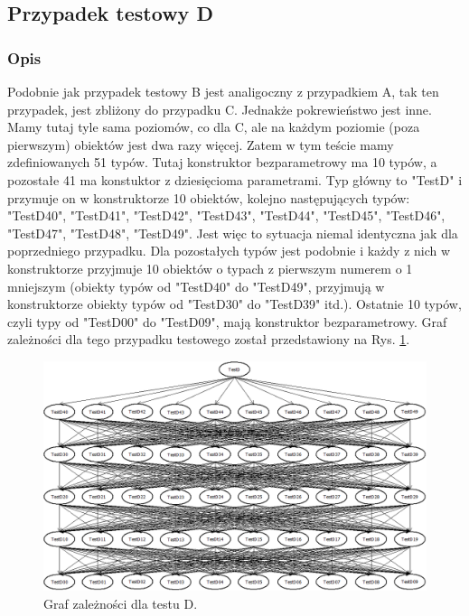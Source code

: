 \documentclass[12pt]{article}
\begin{document}
\subsection{Przypadek testowy D}
\subsubsection{Opis}
Podobnie jak przypadek testowy B jest analigoczny z przypadkiem A, tak ten przypadek, jest zbliżony do przypadku C. Jednakże pokrewieństwo jest inne. Mamy tutaj tyle sama poziomów, co dla C, ale na każdym poziomie (poza pierwszym) obiektów jest dwa razy więcej. Zatem w tym teście mamy zdefiniowanych 51 typów. Tutaj konstruktor bezparametrowy ma 10 typów, a pozostałe 41 ma konstuktor z dziesięcioma parametrami. Typ główny to "TestD" i przymuje on w konstruktorze 10 obiektów, kolejno następujących typów: "TestD40", "TestD41", "TestD42", "TestD43", "TestD44", "TestD45", "TestD46", "TestD47", "TestD48", "TestD49". Jest więc to sytuacja niemal identyczna jak dla poprzedniego przypadku. Dla pozostałych typów jest podobnie i każdy z nich w konstruktorze przyjmuje 10 obiektów o typach z pierwszym numerem o 1 mniejszym (obiekty typów od "TestD40" do "TestD49", przyjmują w konstruktorze obiekty typów od "TestD30" do "TestD39" itd.). Ostatnie 10 typów, czyli typy od "TestD00" do "TestD09", mają konstruktor bezparametrowy. Graf zależności dla tego przypadku testowego został przedstawiony na Rys. \ref{fig:testD}.

\begin{figure}[h]
	\begin{center}
  		\includegraphics[width=\linewidth]{TestD.png}
  		\caption{Graf zależności dla testu D.}
  		\label{fig:testD}
	\end{center}
\end{figure}
\end{document}
